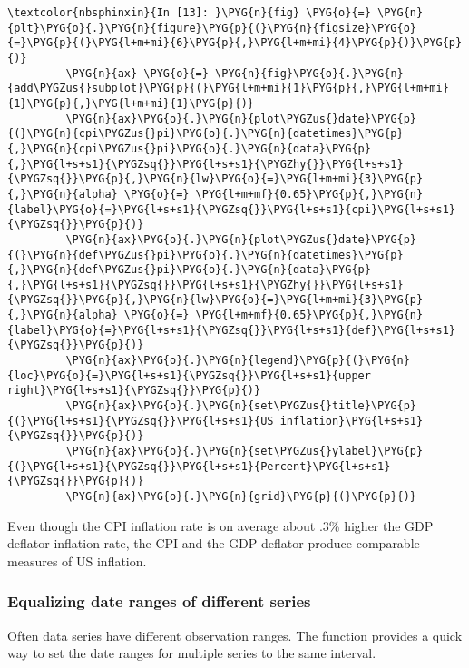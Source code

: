 \documentclass[letterpaper,10pt,openany,oneside,english]{sphinxmanual}
\begin{document}
\begin{Verbatim}[commandchars=\\\{\}]
\textcolor{nbsphinxin}{In [13]: }\PYG{n}{fig} \PYG{o}{=} \PYG{n}{plt}\PYG{o}{.}\PYG{n}{figure}\PYG{p}{(}\PYG{n}{figsize}\PYG{o}{=}\PYG{p}{(}\PYG{l+m+mi}{6}\PYG{p}{,}\PYG{l+m+mi}{4}\PYG{p}{)}\PYG{p}{)}
         \PYG{n}{ax} \PYG{o}{=} \PYG{n}{fig}\PYG{o}{.}\PYG{n}{add\PYGZus{}subplot}\PYG{p}{(}\PYG{l+m+mi}{1}\PYG{p}{,}\PYG{l+m+mi}{1}\PYG{p}{,}\PYG{l+m+mi}{1}\PYG{p}{)}
         \PYG{n}{ax}\PYG{o}{.}\PYG{n}{plot\PYGZus{}date}\PYG{p}{(}\PYG{n}{cpi\PYGZus{}pi}\PYG{o}{.}\PYG{n}{datetimes}\PYG{p}{,}\PYG{n}{cpi\PYGZus{}pi}\PYG{o}{.}\PYG{n}{data}\PYG{p}{,}\PYG{l+s+s1}{\PYGZsq{}}\PYG{l+s+s1}{\PYGZhy{}}\PYG{l+s+s1}{\PYGZsq{}}\PYG{p}{,}\PYG{n}{lw}\PYG{o}{=}\PYG{l+m+mi}{3}\PYG{p}{,}\PYG{n}{alpha} \PYG{o}{=} \PYG{l+m+mf}{0.65}\PYG{p}{,}\PYG{n}{label}\PYG{o}{=}\PYG{l+s+s1}{\PYGZsq{}}\PYG{l+s+s1}{cpi}\PYG{l+s+s1}{\PYGZsq{}}\PYG{p}{)}
         \PYG{n}{ax}\PYG{o}{.}\PYG{n}{plot\PYGZus{}date}\PYG{p}{(}\PYG{n}{def\PYGZus{}pi}\PYG{o}{.}\PYG{n}{datetimes}\PYG{p}{,}\PYG{n}{def\PYGZus{}pi}\PYG{o}{.}\PYG{n}{data}\PYG{p}{,}\PYG{l+s+s1}{\PYGZsq{}}\PYG{l+s+s1}{\PYGZhy{}}\PYG{l+s+s1}{\PYGZsq{}}\PYG{p}{,}\PYG{n}{lw}\PYG{o}{=}\PYG{l+m+mi}{3}\PYG{p}{,}\PYG{n}{alpha} \PYG{o}{=} \PYG{l+m+mf}{0.65}\PYG{p}{,}\PYG{n}{label}\PYG{o}{=}\PYG{l+s+s1}{\PYGZsq{}}\PYG{l+s+s1}{def}\PYG{l+s+s1}{\PYGZsq{}}\PYG{p}{)}
         \PYG{n}{ax}\PYG{o}{.}\PYG{n}{legend}\PYG{p}{(}\PYG{n}{loc}\PYG{o}{=}\PYG{l+s+s1}{\PYGZsq{}}\PYG{l+s+s1}{upper right}\PYG{l+s+s1}{\PYGZsq{}}\PYG{p}{)}
         \PYG{n}{ax}\PYG{o}{.}\PYG{n}{set\PYGZus{}title}\PYG{p}{(}\PYG{l+s+s1}{\PYGZsq{}}\PYG{l+s+s1}{US inflation}\PYG{l+s+s1}{\PYGZsq{}}\PYG{p}{)}
         \PYG{n}{ax}\PYG{o}{.}\PYG{n}{set\PYGZus{}ylabel}\PYG{p}{(}\PYG{l+s+s1}{\PYGZsq{}}\PYG{l+s+s1}{Percent}\PYG{l+s+s1}{\PYGZsq{}}\PYG{p}{)}
         \PYG{n}{ax}\PYG{o}{.}\PYG{n}{grid}\PYG{p}{(}\PYG{p}{)}
\end{Verbatim}

\noindent{}

Even though the CPI inflation rate is on average about .3\% higher the
GDP deflator inflation rate, the CPI and the GDP deflator produce
comparable measures of US inflation.


\subsubsection{Equalizing date ranges of different series}
\label{\detokenize{fredpy_examples:Equalizing-date-ranges-of-different-series}}
Often data series have different observation ranges. The {\hyperref[\detokenize{additional_functions:fredpy.window_equalize}]{}} function provides a quick way to set the date ranges for multiple series to the same interval.
\end{document}
